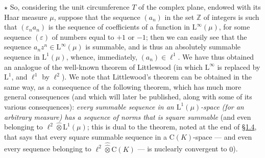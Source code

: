 \documentclass[british]{article}
\begin{document}
\(\star\) So, considering the unit circumference \(T\) of the complex
plane, endowed with its Haar measure \(\mu\), suppose that the sequence
\((a_n)\) in the set \(\mathbb{Z}\) of integers is such that
\((\varepsilon_n a_n)\) is the sequence of coefficients of a function in
\(\mathrm{L}^\infty(\mu)\), for some sequence \((\varepsilon)\) of
numbers equal to \(+1\) or \(-1\); then we can easily see that the
sequence \(a_nz^n\in\mathrm{L}^\infty(\mu)\) is summable, and is thus an
absolutely summable sequence in \(\mathrm{L}^1(\mu)\), whence,
immediately, \((a_n)\in\ell^1\). We have thus obtained an analogue of
the well-known theorem of Littlewood (in which \(\mathrm{L}^\infty\) is
replaced by \(\mathrm{L}^1\), and \(\ell^1\) by \(\ell^2\)). We note
that Littlewood's theorem can be obtained in the same way, as a
consequence of the following theorem, which has much more general
consequences (and which will later be published, along with some of its
various consequences): \emph{every summable sequence in an
\(\mathrm{L}^1(\mu)\)-space (for an arbitrary measure) has a sequence of
norms that is square summable} (and even belonging to
\(\ell^2\hat{\otimes}\mathrm{L}^1(\mu)\); this is dual to the theorem,
noted at the end of \hyperref[section-1.4]{§1.4}, that says that every
square summable sequence in a \(\mathrm{C}(K)\)-space --- and even every
sequence belonging to \(\ell^2\hat{\hat{\otimes}}\mathrm{C}(K)\) --- is
nuclearly convergent to \(0\)).
\end{document}
